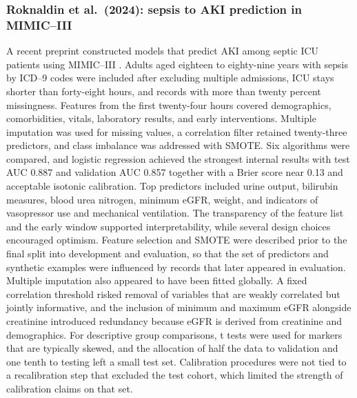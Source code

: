\subsubsection{Roknaldin et al.\ (2024): sepsis to AKI prediction in MIMIC--III}
A recent preprint constructed models that predict AKI among septic ICU patients using MIMIC--III \citep{Roknaldin_2024_arXiv}. Adults aged eighteen to eighty-nine years with sepsis by ICD--9 codes were included after excluding multiple admissions, ICU stays shorter than forty-eight hours, and records with more than twenty percent missingness. Features from the first twenty-four hours covered demographics, comorbidities, vitals, laboratory results, and early interventions. Multiple imputation was used for missing values, a correlation filter retained twenty-three predictors, and class imbalance was addressed with SMOTE. Six algorithms were compared, and logistic regression achieved the strongest internal results with test AUC 0.887 and validation AUC 0.857 together with a Brier score near 0.13 and acceptable isotonic calibration. Top predictors included urine output, bilirubin measures, blood urea nitrogen, minimum eGFR, weight, and indicators of vasopressor use and mechanical ventilation. The transparency of the feature list and the early window supported interpretability, while several design choices encouraged optimism. Feature selection and SMOTE were described prior to the final split into development and evaluation, so that the set of predictors and synthetic examples were influenced by records that later appeared in evaluation. Multiple imputation also appeared to have been fitted globally. A fixed correlation threshold risked removal of variables that are weakly correlated but jointly informative, and the inclusion of minimum and maximum eGFR alongside creatinine introduced redundancy because eGFR is derived from creatinine and demographics. For descriptive group comparisons, t tests were used for markers that are typically skewed, and the allocation of half the data to validation and one tenth to testing left a small test set. Calibration procedures were not tied to a recalibration step that excluded the test cohort, which limited the strength of calibration claims on that set.

